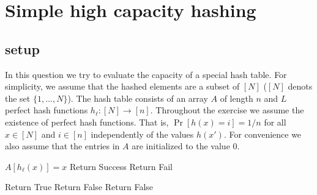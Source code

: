 \documentclass{article}
\begin{document}
\pagebreak






\section{Simple high capacity hashing}
\subsection*{setup}
In this question we try to evaluate the capacity of a special hash table.
For simplicity, we assume that the hashed elements are a subset of $[N]$ ($[N]$ denots the set $\{1,\dots,N\}$).
The hash table consists of an array $A$ of length $n$ and $L$ perfect hash functions $h_\ell: [N] \rightarrow [n]$.
Throughout the exercise we assume the existence of perfect hash functions. That is, $\Pr[h(x) = i] = 1/n$ for all $x \in [N]$ and $i\in [n]$ 
independently of the values $h(x')$.  For convenience we also assume that the entries in $A$ are initialized to the value $0$.
%
\begin{algorithm}
\caption{$Add(x)$}
\begin{algorithmic}
\FOR {$\ell \in [L]$}
    	\STATE $A[h_\ell(x)] = x$
	\STATE Return Success
    \ENDIF
\ENDFOR
\STATE Return Fail
\end{algorithmic}
\end{algorithm}
%
\vspace{-.6cm}
\begin{algorithm}
\caption{$Query(x)$}
\begin{algorithmic}
\FOR {$\ell \in [L]$}
	\STATE Return True
   	\STATE Return False
    \ENDIF
\ENDFOR
\STATE Return False
\end{algorithmic}
\end{algorithm}
%
\vspace{-.6cm}
\end{document}
